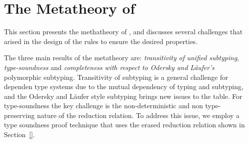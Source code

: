 \section{The Metatheory of \name}
\label{sec:metatheory}

This section presents the methatheory of \name, and discusses several challenges
that arised in the design of the rules to ensure the desired properties.

The three main results of the metatheory are:
\emph{transitivity of unified subtyping}, \emph{type-soundness} and
\emph{completeness with respect to Odersky and L\"aufer's} polymorphic
subtyping. Transitivity of subtyping is a general challenge for dependen type systems due
to the mutual dependency of typing and subtyping, and the Odersky and L\"aufer style
subtyping brings new issues to the table. For type-soundness the key challenge
is the non-deterministic and non type-preserving nature of the reduction relation.
To address this issue, we employ a type soundness proof technique
that uses the erased reduction relation shown in Section~\ref{}.


\begin{comment}
In this section, we introduce the design choices of \name to handle to challenge
brought by the dependent generalization of DK's declarative subtyping rules.
We also present the desired properties for \name to hold, which contribute to
the proof of transitivity and type safety.

Transitivity of subtyping is a general challenge for dependent type systems due
to the mutual dependency of typing and subtyping. Thankfully the Unified Subtyping
combines the two so there is only one judgement to reason about. Although
significantly simplified in one aspect, the DK's style subtyping brings new issues
on the table.

Although we have imposed restrictions on the implicit instantiation, they do not
change the indeterministic and non-type-preserving nature of the direct operational
semantics, due to not having access to typing information in the dynamic semantics.
So we choose a indirect path to show the type safety of \name.

And finally we expect the subtyping relation of \name to subsume the DK's
declarative subtyping.
\end{comment}


